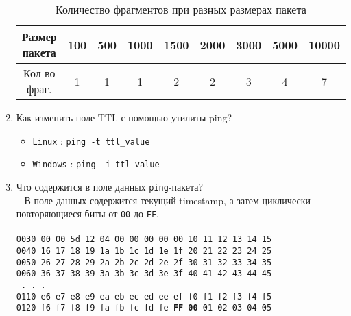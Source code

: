 \documentclass[12pt, a4paper]{article}
\begin{document}
\begin{enumerate}
    \begin{table}[h]
    \begin{center}
    \begin{small}
      \caption{Количество фрагментов при разных размерах пакета}
      \begin{tabular}{| c | c | c | c | c | c | c | c | c |}
        \hline
        Размер пакета & 100 &	500 & 1000 & 1500 & 2000 & 3000 & 5000 & 10000\\
        \hline
        Кол-во фраг. & 1 & 1 & 1 & 2 & 2 & 3 & 4 & 7\\
        \hline
      \end{tabular}
      \label{Tab:frag}
    \end{small}
    \end{center}
    \end{table}
  \item Как изменить поле TTL с помощью утилиты ping?\\
    \begin{itemize}
      \item \texttt{Linux} : \texttt{ping -t ttl\_value}
      \item \texttt{Windows} : \texttt{ping -i ttl\_value}
    \end{itemize}
  \item Что содержится в поле данных \texttt{ping}-пакета?\\
    -- В поле данных содержится текущий timestamp, а затем циклически
    повторяющиеся биты от \texttt{00} до \texttt{FF}.\\ \\
    \texttt{0030   00 00 5d 12 04 00 00 00 00 00 10 11 12 13 14 15}\\
    \texttt{0040   16 17 18 19 1a 1b 1c 1d 1e 1f 20 21 22 23 24 25}\\
    \texttt{0050   26 27 28 29 2a 2b 2c 2d 2e 2f 30 31 32 33 34 35}\\
    \texttt{0060   36 37 38 39 3a 3b 3c 3d 3e 3f 40 41 42 43 44 45}\\
    \texttt{                    .       .       .                 }\\
    \texttt{0110   e6 e7 e8 e9 ea eb ec ed ee ef f0 f1 f2 f3 f4 f5}\\
    \texttt{0120   f6 f7 f8 f9 fa fb fc fd fe \textbf{FF 00} 01 02 03 04 05}\\
\end{enumerate}
\end{document}
